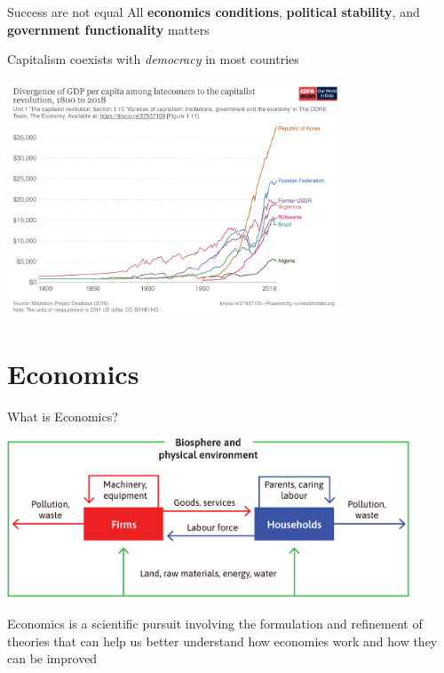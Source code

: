 \documentclass[11pt,aspectratio=43,usenames,dvipsnames]{beamer}
\theoremstyle{definition}
\begin{document}
\begin{frame}{Success are not equal}
\label{slide:Success_are_not_equal}
    All \textbf{economics conditions}, \textbf{political stability}, and \textbf{government functionality} matters

    Capitalism coexists with \textit{democracy} in most countries
    \begin{center}
        \includegraphics[width=0.75\textwidth]{./figures/divergence-of-gdp-per-capita-among-latecomers-to-the-capitalist-revolution-18002016.png}
    \end{center}
\end{frame}

\section{Economics}
\label{sec:Economics}

\begin{frame}{What is Economics?}
\label{slide:What_is_Economics_}
    \begin{center}
        \includegraphics[width=0.9\textwidth]{./figures/Figure1_15.png}
    \end{center}
    Economics is a \alert{scientific pursuit} involving the formulation and \alert{refinement of theories} that can help us better understand \alert{how economies work} and \alert{how they can be improved}
\end{frame}
\end{document}
